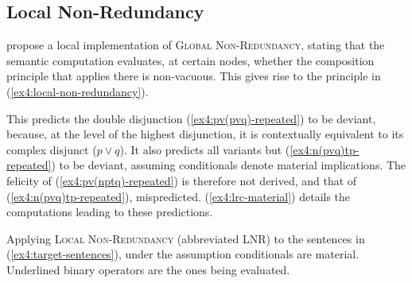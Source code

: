 \subsection{Local Non-Redundancy}
\citet{Katzir2014} propose a local implementation of \textsc{Global Non-Redundancy}, stating that the semantic computation evaluates, at
certain nodes, whether the composition principle that applies there is non-vacuous. This gives rise to the principle in (\ref{ex4:local-non-redundancy}).

\begin{exe}
	\label{ex4:local-non-redundancy}
\end{exe}

This predicts the double disjunction (\ref{ex4:pv(pvq)-repeated}) to be deviant, because, at the level of the highest disjunction, it is contextually equivalent to its complex disjunct ($p\vee q$). It also predicts all variants but (\ref{ex4:n(pvq)tp-repeated}) to be deviant, assuming conditionals denote material implications. The felicity of (\ref{ex4:pv(nptq)-repeated}) is therefore not derived, and that of (\ref{ex4:n(pvq)tp-repeated}), mispredicted. (\ref{ex4:lrc-material}) details the computations leading to these predictions.

\begin{exe}
	\ex Applying \textsc{Local Non-Redundancy} (abbreviated LNR) to the sentences in (\ref{ex4:target-sentences}), under the assumption conditionals are material. Underlined binary operators are the ones being evaluated. \label{ex4:lrc-material}
	\begin{xlist}
		\label{ex4:pv(pvq)-lnr-material}
		\label{ex4:npt(pvq)-lnr-material}
		\label{ex4:pv(nptq)-lnr-material}
		\label{ex4:pv(nqtp)-lnr-material}
		\label{ex4:n(pvq)tp-lnr-material}
	\end{xlist}
\end{exe}


